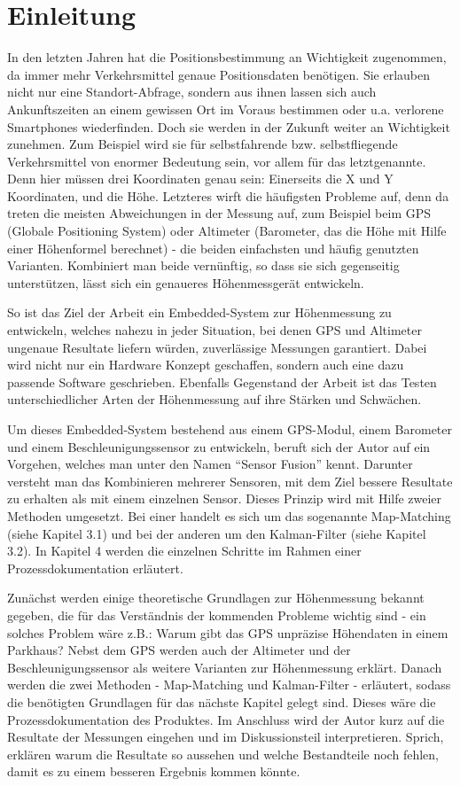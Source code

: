 \chapter{Einleitung}
In den letzten Jahren hat die Positionsbestimmung an Wichtigkeit zugenommen, da immer mehr Verkehrsmittel genaue Positionsdaten benötigen. Sie erlauben nicht nur eine Standort-Abfrage, sondern aus ihnen lassen sich auch Ankunftszeiten an einem gewissen Ort im Voraus bestimmen oder u.a. verlorene Smartphones wiederfinden. Doch sie werden in der Zukunft weiter an Wichtigkeit zunehmen. Zum Beispiel wird sie für selbstfahrende bzw. selbstfliegende Verkehrsmittel von enormer Bedeutung sein, vor allem für das letztgenannte. Denn hier müssen drei Koordinaten genau sein: Einerseits die X und Y Koordinaten, und die Höhe. Letzteres wirft die häufigsten Probleme auf, denn da treten die meisten Abweichungen in der Messung auf, zum Beispiel beim GPS (Globale Positioning System) oder Altimeter (Barometer, das die Höhe mit Hilfe einer Höhenformel berechnet) - die beiden einfachsten und häufig genutzten Varianten. Kombiniert man beide vernünftig, so dass sie sich gegenseitig unterstützen, lässt sich ein genaueres Höhenmessgerät entwickeln.

So ist das Ziel der Arbeit ein Embedded-System zur Höhenmessung zu entwickeln, welches nahezu in jeder Situation, bei denen GPS und Altimeter ungenaue Resultate liefern würden, zuverlässige Messungen garantiert. Dabei wird nicht nur ein Hardware Konzept geschaffen, sondern auch eine dazu passende Software geschrieben. Ebenfalls Gegenstand der Arbeit ist das Testen unterschiedlicher Arten der Höhenmessung auf ihre Stärken und Schwächen. 

Um dieses Embedded-System bestehend aus einem GPS-Modul, einem Barometer und einem Beschleunigungssensor zu entwickeln, beruft sich der Autor auf ein Vorgehen, welches man unter den Namen “Sensor Fusion” kennt. Darunter versteht man das Kombinieren mehrerer Sensoren, mit dem Ziel bessere Resultate zu erhalten als mit einem einzelnen Sensor. Dieses Prinzip wird mit Hilfe zweier Methoden umgesetzt. Bei einer handelt es sich um das sogenannte Map-Matching (siehe Kapitel 3.1) und bei der anderen um den Kalman-Filter (siehe Kapitel 3.2). In Kapitel 4 werden die einzelnen Schritte im Rahmen einer Prozessdokumentation erläutert. 

Zunächst werden einige theoretische Grundlagen zur Höhenmessung bekannt gegeben, die für das Verständnis der kommenden Probleme wichtig sind - ein solches Problem wäre z.B.: Warum gibt das GPS unpräzise Höhendaten in einem Parkhaus? Nebst dem GPS werden auch der Altimeter und der Beschleunigungssensor als weitere Varianten zur Höhenmessung erklärt. Danach werden die zwei Methoden - Map-Matching und Kalman-Filter - erläutert, sodass die benötigten Grundlagen für das nächste Kapitel gelegt sind. Dieses wäre die Prozessdokumentation des Produktes. Im Anschluss wird der Autor kurz auf die Resultate der Messungen eingehen und im Diskussionsteil interpretieren. Sprich, erklären warum die Resultate so aussehen und welche Bestandteile noch fehlen, damit es zu einem besseren Ergebnis kommen könnte.
